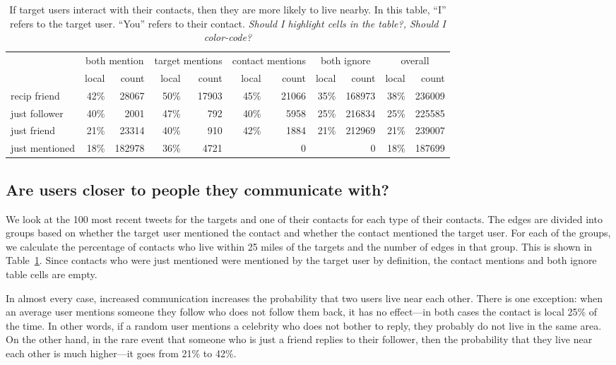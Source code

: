 \documentclass[letterpaper]{article}
\newcommand{\jam}[1]{\emph{#1}}
\newcommand{\flsec}[1]{\subsection{#1}}
\begin{document}
\begin{table}[tbh]
\scriptsize
\centering
\begin{tabular}{l | r r | r r | r r | r r | r r}
    & \multicolumn{2}{c}{both mention}
    & \multicolumn{2}{|c}{target mentions}
    & \multicolumn{2}{|c}{contact mentions}
    & \multicolumn{2}{|c}{both ignore}
    & \multicolumn{2}{|c}{overall} \\
    \cline{2-11}
    &local&count&local&count&local&count&local&count&local&count \\
    \hline
    recip friend & 42\%&28067 & 50\%&17903 & 45\%&21066 & 35\%&168973 & 38\%&236009 \\
    just follower & 40\%&2001 & 47\%&792 & 40\%&5958 & 25\%&216834 & 25\%&225585 \\
    just friend & 21\%&23314 & 40\%&910 & 42\%&1884 & 21\%&212969 & 21\%&239007 \\
    just mentioned & 18\%&182978 & 36\%&4721 & & 0 & & 0 & 18\%&187699 \\
\end{tabular}
\caption{
If target users interact with their contacts, then they are more likely to
live nearby.
%
In this table, ``I'' refers to the target user. ``You'' refers to their
contact.
%
\jam{Should I highlight cells in the table?, Should I color-code?}
}
\label{tab:ComTypes}
\end{table}

\flsec{Are users closer to people they communicate with?}

We look at the 100 most recent tweets for the targets and one of their
contacts for each type of their contacts.
%
The edges are divided into groups based on whether the target user
mentioned the contact and whether the contact mentioned the target user.
%
For each of the groups, we calculate the percentage of contacts who
live within 25 miles of the targets and the number of edges in that group.
%
This is shown in Table~\ref{tab:ComTypes}.
%
Since contacts who were just mentioned were mentioned by the target
user by definition, the contact mentions and both ignore table cells are
empty.

In almost every case, increased communication increases the probability that
two users live near each other.
%
There is one exception: when an average user mentions someone they follow who
does not follow them back, it has no effect---in both cases the contact is
local 25\% of the time.
%
In other words, if a random user mentions a celebrity who does not bother to
reply, they probably do not live in the same area.
%
On the other hand, in the rare event that someone who is just a friend replies
to their follower, then the probability that they live near each other is much
higher---it goes from 21\% to 42\%.
\end{document}
